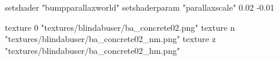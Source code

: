 	setshader "bumpparallaxworld"
	setshaderparam "parallaxscale" 0.02 -0.01

		texture 0 "textures/blindabuser/ba_concrete02.png"
		texture n "textures/blindabuser/ba_concrete02_nm.png"
		texture z "textures/blindabuser/ba_concrete02_hm.png"

